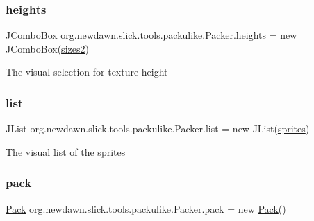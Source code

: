 \subsubsection{\texorpdfstring{heights}{heights}}
{\footnotesize\ttfamily J\+Combo\+Box org.\+newdawn.\+slick.\+tools.\+packulike.\+Packer.\+heights = new J\+Combo\+Box(\mbox{\hyperlink{classorg_1_1newdawn_1_1slick_1_1tools_1_1packulike_1_1_packer_a88ad350f9bcdf274650f612a9fec4fd4}{sizes2}})\hspace{0.3cm}{\ttfamily [private]}}

The visual selection for texture height \mbox{\label{classorg_1_1newdawn_1_1slick_1_1tools_1_1packulike_1_1_packer_a45e8438e951eb84f2efaf06e5ae481bd}} 
\subsubsection{\texorpdfstring{list}{list}}
{\footnotesize\ttfamily J\+List org.\+newdawn.\+slick.\+tools.\+packulike.\+Packer.\+list = new J\+List(\mbox{\hyperlink{classorg_1_1newdawn_1_1slick_1_1tools_1_1packulike_1_1_packer_a5684e96219ce89e574c4550d3c650eaa}{sprites}})\hspace{0.3cm}{\ttfamily [private]}}

The visual list of the sprites \mbox{\label{classorg_1_1newdawn_1_1slick_1_1tools_1_1packulike_1_1_packer_a7e75cbdd91211b7a08a6a5a587575fe6}} 
\subsubsection{\texorpdfstring{pack}{pack}}
{\footnotesize\ttfamily \mbox{\hyperlink{classorg_1_1newdawn_1_1slick_1_1tools_1_1packulike_1_1_pack}{Pack}} org.\+newdawn.\+slick.\+tools.\+packulike.\+Packer.\+pack = new \mbox{\hyperlink{classorg_1_1newdawn_1_1slick_1_1tools_1_1packulike_1_1_pack}{Pack}}()\hspace{0.3cm}{\ttfamily [private]}}

